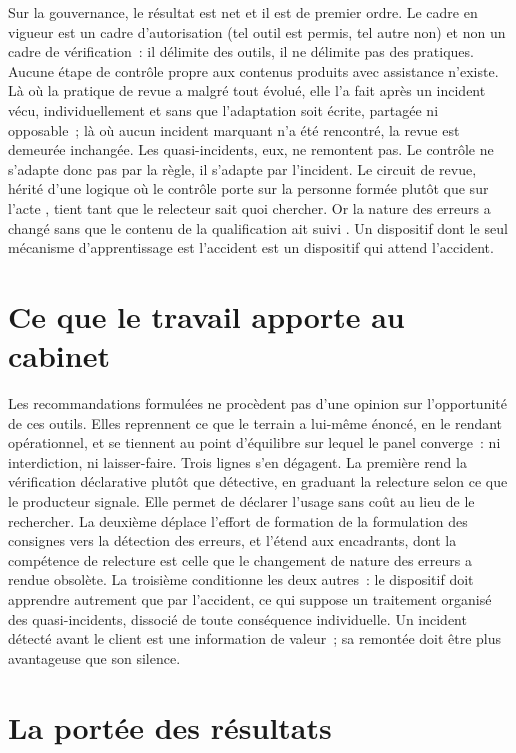 Sur la gouvernance, le résultat est net et il est de premier ordre. Le cadre en vigueur est
un cadre d'autorisation (tel outil est permis, tel autre non) et non un cadre de
vérification~: il délimite des outils, il ne délimite pas des pratiques. Aucune étape de
contrôle propre aux contenus produits avec assistance n'existe. Là où la pratique de revue a
malgré tout évolué, elle l'a fait après un incident vécu, individuellement et sans que
l'adaptation soit écrite, partagée ni opposable~; là où aucun incident marquant n'a été
rencontré, la revue est demeurée inchangée. Les quasi-incidents, eux, ne remontent pas. Le contrôle ne
s'adapte donc pas par la règle, il s'adapte par l'incident. Le circuit de revue, hérité d'une
logique où le contrôle porte sur la personne formée plutôt que sur l'acte
\cite{mintzberg1982}, tient tant que le relecteur sait quoi chercher. Or la nature des
erreurs a changé sans que le contenu de la qualification ait suivi \cite{lebovitz2022}. Un
dispositif dont le seul mécanisme d'apprentissage est l'accident est un dispositif qui attend
l'accident.

\section{Ce que le travail apporte au cabinet}

Les recommandations formulées ne procèdent pas d'une opinion sur l'opportunité de ces outils.
Elles reprennent ce que le terrain a lui-même énoncé, en le rendant opérationnel, et se
tiennent au point d'équilibre sur lequel le panel converge~: ni interdiction, ni
laisser-faire. Trois lignes s'en dégagent. La première rend la vérification déclarative
plutôt que détective, en graduant la relecture selon ce que le producteur signale. Elle
permet de déclarer l'usage sans coût au lieu de le rechercher. La deuxième
déplace l'effort de formation de la formulation des consignes vers la détection des erreurs,
et l'étend aux encadrants, dont la compétence de relecture est celle que le changement de
nature des erreurs a rendue obsolète. La troisième conditionne les deux autres~: le
dispositif doit apprendre autrement que par l'accident, ce qui suppose un traitement organisé
des quasi-incidents, dissocié de toute conséquence individuelle. Un incident détecté avant le
client est une information de valeur~; sa remontée doit être plus avantageuse que son
silence.

\section{La portée des résultats}

